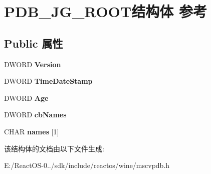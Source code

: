 \hypertarget{struct_p_d_b___j_g___r_o_o_t}{}\section{P\+D\+B\+\_\+\+J\+G\+\_\+\+R\+O\+O\+T结构体 参考}
\label{struct_p_d_b___j_g___r_o_o_t}
\subsection*{Public 属性}
\begin{DoxyCompactItemize}
\item 
\mbox{\label{struct_p_d_b___j_g___r_o_o_t_a19eae73afc9289bde61008ef5d6a802e}} 
D\+W\+O\+RD {\bfseries Version}
\item 
\mbox{\label{struct_p_d_b___j_g___r_o_o_t_af7018f7186c2a8d35678cceaa496da1a}} 
D\+W\+O\+RD {\bfseries Time\+Date\+Stamp}
\item 
\mbox{\label{struct_p_d_b___j_g___r_o_o_t_a5464c5439e8da09977fe0e30357f764a}} 
D\+W\+O\+RD {\bfseries Age}
\item 
\mbox{\label{struct_p_d_b___j_g___r_o_o_t_aeb6f4e68a1e9dd995160fd5b97a1b5dc}} 
D\+W\+O\+RD {\bfseries cb\+Names}
\item 
\mbox{\label{struct_p_d_b___j_g___r_o_o_t_a30749d424be0547cc1cdb1213e8f5a36}} 
C\+H\+AR {\bfseries names} \mbox{[}1\mbox{]}
\end{DoxyCompactItemize}


该结构体的文档由以下文件生成\+:\begin{DoxyCompactItemize}
\item 
E\+:/\+React\+O\+S-\/0../sdk/include/reactos/wine/mscvpdb.\+h\end{DoxyCompactItemize}
